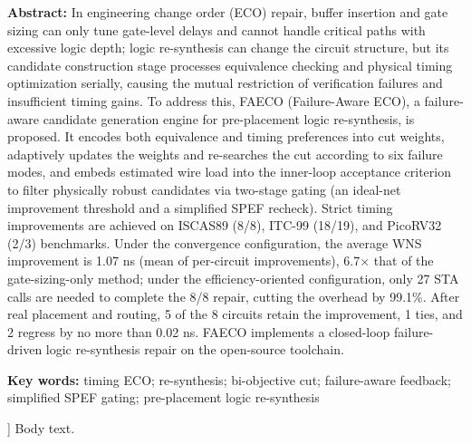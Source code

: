\documentclass[twocolumn,10pt]{ctexart}
\begin{document}
\begin{flushleft}
{\bfseries Abstract:} {\small In engineering change order (ECO) repair, buffer insertion and gate sizing can only tune gate-level delays and cannot handle critical paths with excessive logic depth; logic re-synthesis can change the circuit structure, but its candidate construction stage processes equivalence checking and physical timing optimization serially, causing the mutual restriction of verification failures and insufficient timing gains. To address this, FAECO (Failure-Aware ECO), a failure-aware candidate generation engine for pre-placement logic re-synthesis, is proposed. It encodes both equivalence and timing preferences into cut weights, adaptively updates the weights and re-searches the cut according to six failure modes, and embeds estimated wire load into the inner-loop acceptance criterion to filter physically robust candidates via two-stage gating (an ideal-net improvement threshold and a simplified SPEF recheck). Strict timing improvements are achieved on ISCAS89 (8/8), ITC-99 (18/19), and PicoRV32 (2/3) benchmarks. Under the convergence configuration, the average WNS improvement is 1.07 ns (mean of per-circuit improvements), 6.7$\times$ that of the gate-sizing-only method; under the efficiency-oriented configuration, only 27 STA calls are needed to complete the 8/8 repair, cutting the overhead by 99.1\%. After real placement and routing, 5 of the 8 circuits retain the improvement, 1 ties, and 2 regress by no more than 0.02 ns. FAECO implements a closed-loop failure-driven logic re-synthesis repair on the open-source toolchain.}\par
\vspace{3pt}
{\bfseries Key words:} {\small timing ECO; re-synthesis; bi-objective cut; failure-aware feedback; simplified SPEF gating; pre-placement logic re-synthesis}\par
\end{flushleft}
]
Body text.
\end{document}
